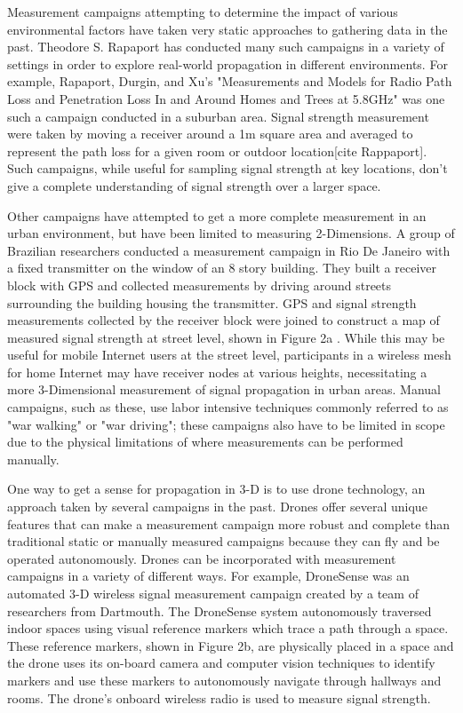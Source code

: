 \documentclass[pageno]{jpaper}
\begin{document}
Measurement campaigns attempting to determine the impact of various environmental factors have taken very static approaches to gathering data in the past. Theodore S. Rapaport has conducted many such campaigns in a variety of settings in order to explore real-world propagation in different environments. For example, Rapaport, Durgin, and Xu's "Measurements and Models for Radio Path Loss and Penetration Loss In and Around Homes and Trees at 5.8GHz" was one such a campaign conducted in a suburban area. Signal strength measurement were taken by moving a receiver around a 1m square area and averaged to represent the path loss for a given room or outdoor location[cite Rappaport]. Such campaigns, while useful for sampling signal strength at key locations, don't give a complete understanding of signal strength over a larger space. 

Other campaigns have attempted to get a more complete measurement in an urban environment, but have been limited to measuring 2-Dimensions. A group of Brazilian researchers conducted a measurement campaign in Rio De Janeiro with a fixed transmitter on the window of an 8 story building. They built a receiver block with GPS and collected measurements by driving around streets surrounding the building housing the transmitter. GPS and signal strength measurements collected by the receiver block were joined to construct a map of measured signal strength at street level, shown in Figure 2a . While this may be useful for mobile Internet users at the street level, participants in a wireless mesh for home Internet may have receiver nodes at various heights, necessitating a more 3-Dimensional measurement of signal propagation in urban areas. Manual campaigns, such as these, use labor intensive techniques commonly referred to as "war walking" or "war driving"; these campaigns also have to be limited in scope due to the physical limitations of where measurements can be performed manually. 

One way to get a sense for propagation in 3-D is to use drone technology, an approach taken by several campaigns in the past. Drones offer several unique features that can make a measurement campaign more robust and complete than traditional static or manually measured campaigns because they can fly and be operated autonomously. Drones can be incorporated with measurement campaigns in a variety of different ways. For example, DroneSense was an automated 3-D wireless signal measurement campaign created by a team of researchers from Dartmouth. The DroneSense system autonomously traversed indoor spaces using visual reference markers which trace a path through a space. These reference markers, shown in Figure 2b, are physically placed in a space and the drone uses its on-board camera and computer vision techniques to identify markers and use these markers to autonomously navigate through hallways and rooms. The drone's onboard wireless radio is used to measure signal strength.
\end{document}
